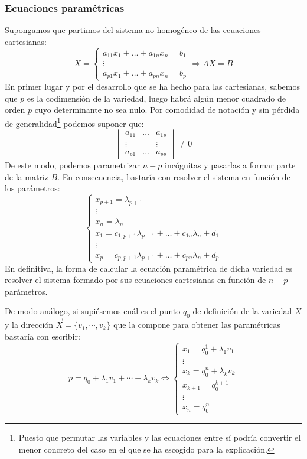\documentclass[10pt,a4paper,openright]{book}
\theoremstyle{break}
\begin{document}
\subsubsection{Ecuaciones paramétricas}
Supongamos que partimos del sistema no homogéneo de las ecuaciones cartesianas:
$$X = \begin{cases} a_{11}x_1 + \ldots +  a_{1n}x_n = b_1 \\ \vdots \\  a_{p1}x_1 + \ldots + a_{pn}x_n = b_p \end{cases} \Rightarrow AX= B$$
En primer lugar y por el desarrollo que se ha hecho para las cartesianas, sabemos que $p$ es la codimensión de la variedad, luego habrá algún menor cuadrado de orden $p$ cuyo determinante no sea nulo. Por comodidad de notación y sin pérdida de generalidad\footnote{Puesto que permutar las variables y las ecuaciones entre sí podría convertir el menor concreto del caso en el que se ha escogido para la explicación.} podemos suponer que:
$$\begin{vmatrix} a_{11} & \ldots & a_{1p} \\ \vdots & & \vdots \\ a_{p1} & \ldots & a_{pp} \end{vmatrix} \neq 0 $$
De este modo, podemos parametrizar $n-p$ incógnitas y pasarlas a formar parte de la matriz $B$. En consecuencia, bastaría con resolver el sistema en función de los parámetros:
$$\begin{cases} x_{p+1} = \lambda_{p+1} \\ \vdots \\ x_n = \lambda_n \\ x_1 = c_{1, p+1} \lambda_{p+1} + \ldots + c_{1n} \lambda_n + d_1 \\ \vdots \\ x_p = c_{p,p+1} \lambda_{p+1} + \ldots + c_{pn} \lambda_n + d_p \end{cases}$$
En definitiva, la forma de calcular la ecuación paramétrica de dicha variedad es resolver el sistema formado por sus ecuaciones cartesianas en función de $n-p$ parámetros.

De modo análogo, si supiésemos cuál es el punto $q_0$ de definición de la variedad $X$ y la dirección $\vec{X}=\{v_1, \cdots, v_k\}$ que la compone para obtener las paramétricas bastaría con escribir:
$$p = q_0 + \lambda_1 v_1 + \cdots + \lambda_k v_k \Leftrightarrow \begin{cases}
x_1 = q_0^1 + \lambda_1 v_1 \\
\vdots \\
x_k = q_0^n + \lambda_k v_k \\
x_{k+1} = q_0^{k+1} \\
\vdots \\
x_{n} = q_0^n
\end{cases}$$
\end{document}
